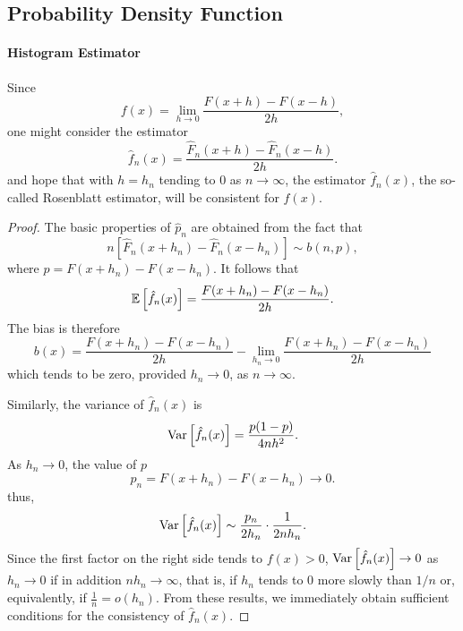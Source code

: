 \subsection{Probability Density Function}

\paragraph{Histogram Estimator}
Since
\begin{equation*}
	f(x)=\lim_{h\rightarrow0}\frac{F(x+h)-F(x-h)}{2h},
\end{equation*}
one might consider the estimator
\begin{equation*}
	\hat{f}_{n}(x)=\frac{\hat{F}_{n}(x+h)-\hat{F}_{n}(x-h)}{2h} .
\end{equation*}
and hope that with $h=h_{n}$ tending to 0 as $n\rightarrow\infty$, the estimator $\hat{f}_{n}(x)$, the so-called Rosenblatt estimator, will be consistent for $f(x)$.

\begin{proof}
	The basic properties of $\hat{p}_{n}$ are obtained from the fact that
	\begin{equation*}
		n\left[\hat{F}_{n}(x+h_{n})-\hat{F}_{n}(x-h_{n})\right]\sim b(n,p),
	\end{equation*}
	where $p=F(x+h_{n})-F(x-h_{n})$. It follows that
	\begin{equation*}
		{\mathbb E}\left[\hat{f}_{n}(x)\right]=\frac{F(x+h_{n})-F(x-h_{n})}{2h}.
	\end{equation*}
	The bias is therefore
	\begin{equation*}
		b(x)=\frac{F(x+h_{n})-F(x-h_{n})}{2h}-\lim_{h_{n}\rightarrow0}\frac{F(x+h_{n})-F(x-h_{n})}{2h}
	\end{equation*}
	which tends to be zero, provided $h_{n}\rightarrow0$, as $n\rightarrow\infty$.

	Similarly, the variance of $\hat{f}_{n}(x)$ is
	\begin{equation*}
		\mathrm{Var}\left[\hat{f}_{n}(x)\right]=\frac{p(1-p)}{4nh^{2}}.
	\end{equation*}
	As $h_{n} \rightarrow 0$, the value of $p$
	\begin{equation*}
		p_{n}=F\left(x+h_{n}\right)-F\left(x-h_{n}\right) \rightarrow 0 .
	\end{equation*}
	thus,
	\begin{equation*}
		\mathrm{Var}\left[\hat{f}_{n}(x)\right]\sim\frac{p_{n}}{2h_{n}}\cdot\frac{1}{2nh_{n}} .
	\end{equation*}
	Since the first factor on the right side tends to $f(x)>0$, $\mathrm{Var}\left[\hat{f}_{n}(x)\right] \rightarrow 0$ as $h_{n}\rightarrow 0$ if in addition $nh_{n}\rightarrow\infty$, that is, if $h_{n}$ tends to 0 more slowly than $1/n$ or, equivalently, if $\frac{1}{n}=o\left(h_{n}\right)$.
	From these results, we immediately obtain sufficient conditions for the consistency of $\hat{f}_{n}(x)$.
\end{proof}

